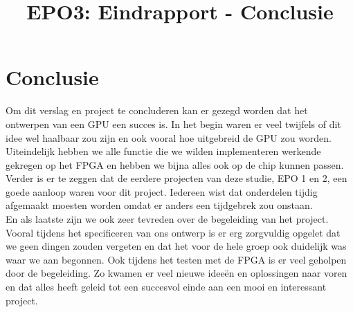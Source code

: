 \documentclass{scrartcl} %
\author{}
\title{EPO3: Eindrapport - Conclusie}
\begin{document}
\chapter{Conclusie}
\label{ch:conclusie}

Om dit verslag en project te concluderen kan er gezegd worden dat het ontwerpen van een GPU een succes is. In het begin waren er veel twijfels of dit idee wel haalbaar zou zijn en ook vooral hoe uitgebreid de GPU zou worden. Uiteindelijk hebben we alle functie die we wilden implementeren werkende gekregen op het FPGA en hebben we bijna alles ook op de chip kunnen passen.\\
Verder is er te zeggen dat de eerdere projecten van deze studie, EPO 1 en 2, een goede aanloop waren voor dit project. Iedereen wist dat onderdelen tijdig afgemaakt moesten worden omdat er anders een tijdgebrek zou onstaan.\\
En als laatste zijn we ook zeer tevreden over de begeleiding van het project. Vooral tijdens het specificeren van ons ontwerp is er erg zorgvuldig opgelet dat we geen dingen zouden vergeten en dat het voor de hele groep ook duidelijk was waar we aan begonnen. Ook tijdens het testen met de FPGA is er veel geholpen door de begeleiding. Zo kwamen er veel nieuwe ideeën en oplossingen naar voren en dat alles heeft geleid tot een succesvol einde aan een mooi en interessant project.
\end{document}
